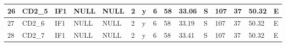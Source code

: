 {\begin{table}[]
\begin{tabular}{|l|l|l|l|l|l|l|l|l|l|l|l|l|l|l|}
		26                                & CD2\_5                                    & IF1                                       & NULL                            & NULL                            & 2                               & y                                    & 6                                                                                    & 58                                                                                   & 33.06                                                                                & S                                                                                 & 107                                                                                   & 37                                                                                    & 50.32                                                                                 & E                                                                                  \\ \hline
		27                                & CD2\_6                                    & IF1                                       & NULL                            & NULL                            & 2                               & y                                    & 6                                                                                    & 58                                                                                   & 33.19                                                                                & S                                                                                 & 107                                                                                   & 37                                                                                    & 50.32                                                                                 & E                                                                                  \\ \hline
		28                                & CD2\_7                                    & IF1                                       & NULL                            & NULL                            & 2                               & y                                    & 6                                                                                    & 58                                                                                   & 33.41                                                                                & S                                                                                 & 107                                                                                   & 37                                                                                    & 50.32                                                                                 & E                                                                                  \\ \hline

\end{tabular}
\end{table}}
